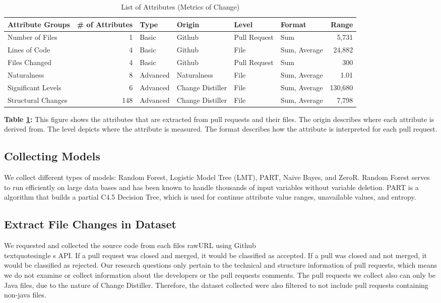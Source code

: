 \documentclass[10pt, conference]{IEEEtran}
\begin{document}
\begin{table}[t]
  \centering
  \caption{List of Attributes (Metrics of Change)}
  \label{figureListOfMetrics}
  \begin{tabular}{l|rllllr}
    \toprule
    \textbf{Attribute Groups} & \textbf{\# of Attributes} & \textbf{Type}& \textbf{Origin} & \textbf{Level} & \textbf{Format} & \textbf{Range}\\ %
    \midrule
    Number of Files & 1 & Basic & Github & Pull Request & Sum & 5,731 \\ %
    Lines of Code & 4 & Basic & Github & File & Sum, Average & 24,882 \\ %
    Files Changed & 4 & Basic & Github & Pull Request & Sum & 300 \\ %
    Naturalness & 8 & Advanced & Naturalness & File & Sum, Average & 1.01\\ %
    Significant Levels & 6 & Advanced & Change Distiller & File & Sum, Average &130,680 \\ %
     Structural Changes & 148 & Advanced & Change Distiller & File & Sum, Average & 7,798 \\ %
    \bottomrule
  \end{tabular}
  \break
  \newline
\textbf{Table \ref{figureListOfMetrics}:} This figure shows the attributes that are extracted from pull requests and their files. The origin describes where each attribute is derived from. The level depicts where the attribute is measured. The format describes how the attribute is interpreted for each pull request.
\end{table}

\subsection{Collecting Models}
We collect different types of models: Random Forest, Logistic Model Tree (LMT), PART, Naive Bayes, and ZeroR. Random Forest serves to run efficiently on large data bases and has been known to handle thousands of input variables without variable deletion. PART is a algorithm that builds a partial C4.5 Decision Tree, which is used for continue attribute value ranges, unavailable values, and entropy. 

\subsection{Extract File Changes in Dataset}
We requested and collected the source code from each file\textquotesingle s rawURL using Github\\textquotesingle s API. If a pull request was closed and merged, it would be classified as accepted. If a pull was closed and not merged, it would be classified as rejected. Our research questions only pertain to the technical and structure information of pull requests, which means we do not examine or collect information about the developers or the pull request\textquotesingle s comments. The pull requests we collect also can only be Java files, due to the nature of Change Distiller. Therefore, the dataset collected were also filtered to not include pull requests containing non-java files.
\end{document}
